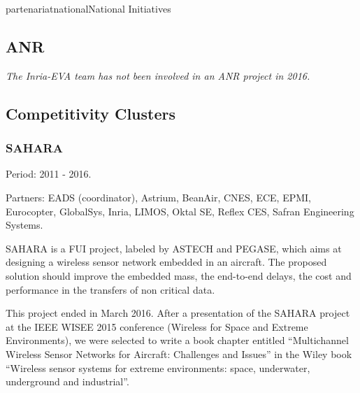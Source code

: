 \documentclass{ra2016}
\begin{document}

\begin{module}{partenariat}{national}{National Initiatives}


\subsection{ANR}

\textit{The Inria-EVA team has not been involved in an ANR project in 2016.}

\subsection{Competitivity Clusters}

\subsubsection{SAHARA}

\begin{participants}
\end{participants}

Period: 2011 - 2016.

Partners: EADS (coordinator), Astrium, BeanAir, CNES, ECE, EPMI, Eurocopter, GlobalSys, Inria, LIMOS, Oktal SE, Reflex CES, Safran Engineering Systems.

SAHARA is a FUI project, labeled by ASTECH and PEGASE, which aims at designing a wireless sensor network embedded in an aircraft. The proposed solution should improve the embedded mass, the end-to-end delays, the cost and performance in the transfers of non critical data. 

This project ended in March 2016. After a presentation of the SAHARA project at the IEEE WISEE 2015 conference (Wireless for Space and Extreme Environments), we were selected to write a book chapter entitled ``Multichannel Wireless Sensor Networks for Aircraft: Challenges and Issues'' in the Wiley book
``Wireless sensor systems for extreme environments: space, underwater, underground and industrial''. 


\end{module}
\end{document}
